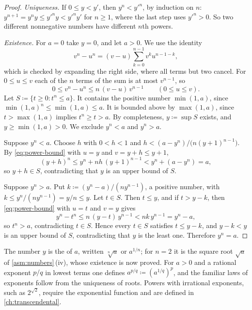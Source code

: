 \begin{proof}
\emph{Uniqueness.} If $0\le y<y'$, then $y^n<y'^n$, by induction on $n$: $y^{n+1}=y^ny\le y'^ny<y'^ny'$ for $n\ge1$, where the last step uses $y'^n>0$. So two different nonnegative numbers have different $n$th powers.

\emph{Existence.} For $a=0$ take $y=0$, and let $a>0$. We use the identity
\begin{equation}
v^n-u^n=(v-u)\sum_{k=0}^{n-1}v^ku^{n-1-k},
\label{eq:power-difference}
\end{equation}
which is checked by expanding the right side, where all terms but two cancel. For $0\le u\le v$ each of the $n$ terms of the sum is at most $v^{n-1}$, so
\begin{equation}
0\le v^n-u^n\le n\,(v-u)\,v^{n-1}\qquad(0\le u\le v).
\label{eq:power-bound}
\end{equation}
Let $S\coloneqq\{t\ge0: t^n\le a\}$. It contains the positive number $\min(1,a)$, since $\min(1,a)^n\le\min(1,a)\le a$. It is bounded above by $\max(1,a)$, since $t>\max(1,a)$ implies $t^n\ge t>a$. By completeness, $y\coloneqq\sup S$ exists, and $y\ge\min(1,a)>0$. We exclude $y^n<a$ and $y^n>a$.

Suppose $y^n<a$. Choose $h$ with $0<h<1$ and $h<(a-y^n)/\bigl(n(y+1)^{n-1}\bigr)$. By \eqref{eq:power-bound} with $u=y$ and $v=y+h\le y+1$,
\[
(y+h)^n\le y^n+nh\,(y+1)^{n-1}<y^n+(a-y^n)=a ,
\]
so $y+h\in S$, contradicting that $y$ is an upper bound of $S$.

Suppose $y^n>a$. Put $k\coloneqq(y^n-a)/(ny^{n-1})$, a positive number, with $k\le y^n/(ny^{n-1})=y/n\le y$. Let $t\in S$. Then $t\le y$, and if $t>y-k$, then \eqref{eq:power-bound} with $u=t$ and $v=y$ gives
\[
y^n-t^n\le n\,(y-t)\,y^{n-1}<nk\,y^{n-1}=y^n-a ,
\]
so $t^n>a$, contradicting $t\in S$. Hence every $t\in S$ satisfies $t\le y-k$, and $y-k<y$ is an upper bound of $S$, contradicting that $y$ is the least one. Therefore $y^n=a$.
\end{proof}

The number $y$ is the  of $a$, written $\sqrt[n]a$ or $a^{1/n}$; for $n=2$ it is the square root $\sqrt a$ of \cref{asm:numbers}\,(iv), whose existence is now proved. For $a>0$ and a rational exponent $p/q$ in lowest terms one defines $a^{p/q}\coloneqq(a^{1/q})^p$, and the familiar laws of exponents follow from the uniqueness of roots. Powers with irrational exponents, such as $2^{\sqrt2}$, require the exponential function and are defined in \cref{ch:transcendental}.

